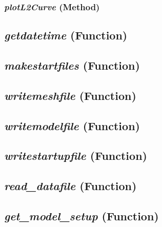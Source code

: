 \subsubsection{\textit{plotL2Curve} (Method)}
\label{sssec:.modeling.occamtools.Occam1D.plotL2Curve}



\subsection{\textit{getdatetime} (Function)}
\label{ssec:.modeling.occamtools.getdatetime}



\subsection{\textit{makestartfiles} (Function)}
\label{ssec:.modeling.occamtools.makestartfiles}



\subsection{\textit{writemeshfile} (Function)}
\label{ssec:.modeling.occamtools.writemeshfile}



\subsection{\textit{writemodelfile} (Function)}
\label{ssec:.modeling.occamtools.writemodelfile}



\subsection{\textit{writestartupfile} (Function)}
\label{ssec:.modeling.occamtools.writestartupfile}



\subsection{\textit{read\_datafile} (Function)}
\label{ssec:.modeling.occamtools.read_datafile}



\subsection{\textit{get\_model\_setup} (Function)}
\label{ssec:.modeling.occamtools.get_model_setup}



